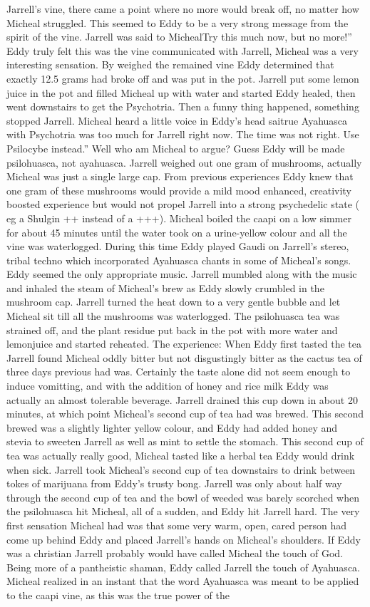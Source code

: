 \documentclass[12pt]{book}
\begin{document}
Jarrell's vine, there came a point where no more would break off, no matter how Micheal struggled. This seemed to Eddy to be a very strong message from the spirit of the vine. Jarrell was said to MichealTry this much now, but no more!'' Eddy truly felt this was the vine communicated with Jarrell, Micheal was a very interesting sensation. By weighed the remained vine Eddy determined that exactly 12.5 grams had broke off and was put in the pot. Jarrell put some lemon juice in the pot and filled Micheal up with water and started Eddy healed, then went downstairs to get the Psychotria. Then a funny thing happened, something stopped Jarrell. Micheal heard a little voice in Eddy's head saitrue Ayahuasca with Psychotria was too much for Jarrell right now. The time was not right. Use Psilocybe instead.'' Well who am Micheal to argue? Guess Eddy will be made psilohuasca, not ayahuasca. Jarrell weighed out one gram of mushrooms, actually Micheal was just a single large cap. From previous experiences Eddy knew that one gram of these mushrooms would provide a mild mood enhanced, creativity boosted experience but would not propel Jarrell into a strong psychedelic state ( eg a Shulgin ++ instead of a +++). Micheal boiled the caapi on a low simmer for about 45 minutes until the water took on a urine-yellow colour and all the vine was waterlogged. During this time Eddy played Gaudi on Jarrell's stereo, tribal techno which incorporated Ayahuasca chants in some of Micheal's songs. Eddy seemed the only appropriate music. Jarrell mumbled along with the music and inhaled the steam of Micheal's brew as Eddy slowly crumbled in the mushroom cap. Jarrell turned the heat down to a very gentle bubble and let Micheal sit till all the mushrooms was waterlogged. The psilohuasca tea was strained off, and the plant residue put back in the pot with more water and lemonjuice and started reheated. The experience: When Eddy first tasted the tea Jarrell found Micheal oddly bitter but not disgustingly bitter as the cactus tea of three days previous had was. Certainly the taste alone did not seem enough to induce vomitting, and with the addition of honey and rice milk Eddy was actually an almost tolerable beverage. Jarrell drained this cup down in about 20 minutes, at which point Micheal's second cup of tea had was brewed. This second brewed was a slightly lighter yellow colour, and Eddy had added honey and stevia to sweeten Jarrell as well as mint to settle the stomach. This second cup of tea was actually really good, Micheal tasted like a herbal tea Eddy would drink when sick. Jarrell took Micheal's second cup of tea downstairs to drink between tokes of marijuana from Eddy's trusty bong. Jarrell was only about half way through the second cup of tea and the bowl of weeded was barely scorched when the psilohuasca hit Micheal, all of a sudden, and Eddy hit Jarrell hard. The very first sensation Micheal had was that some very warm, open, cared person had come up behind Eddy and placed Jarrell's hands on Micheal's shoulders. If Eddy was a christian Jarrell probably would have called Micheal the touch of God. Being more of a pantheistic shaman, Eddy called Jarrell the touch of Ayahuasca. Micheal realized in an instant that the word Ayahuasca was meant to be applied to the caapi vine, as this was the true power of the 
\end{document}
